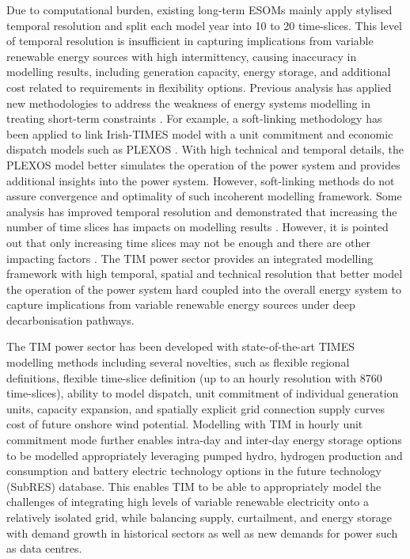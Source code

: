 \documentclass[gmd,manuscript]{copernicus}
\begin{document}
Due to computational burden, existing long-term ESOMs mainly apply stylised temporal resolution and split each model year into 10 to 20 time-slices. This level of temporal resolution is insufficient in capturing implications from variable renewable energy sources with high intermittency, causing inaccuracy in modelling results, including generation capacity, energy storage, and additional cost related to requirements in flexibility options. Previous analysis has applied new methodologies to address the weakness of energy systems modelling in treating short-term constraints \citep{Collins2017}. For example, a soft-linking methodology has been applied to link Irish-TIMES model with a unit commitment and economic dispatch models such as PLEXOS \citep{Deane2012}. With high technical and temporal details, the PLEXOS model better simulates the operation of the power system and provides additional insights into the power system. However, soft-linking methods do not assure convergence and optimality of such incoherent modelling framework. Some analysis has improved temporal resolution and demonstrated that increasing the number of time slices has impacts on modelling results \citep{Pina2011,Kannan2013,Gaur2019}. However, it is pointed out that only increasing time slices may not be enough and there are other impacting factors \citep{Poncelet2016}. The TIM power sector provides an integrated modelling framework with high temporal, spatial and technical resolution that better model the operation of the power system hard coupled into the overall energy system to capture implications from variable renewable energy sources under deep decarbonisation pathways. 

The TIM power sector has been developed with state-of-the-art TIMES modelling methods including several novelties, such as flexible regional definitions, flexible time-slice definition (up to an hourly resolution with 8760 time-slices), ability to model dispatch, unit commitment of individual generation units, capacity expansion, and spatially explicit grid connection supply curves cost of future onshore wind potential. Modelling with TIM in hourly unit commitment mode further enables intra-day and inter-day energy storage options to be modelled appropriately leveraging pumped hydro, hydrogen production and consumption and battery electric technology options in the future technology (SubRES) database. This enables TIM to be able to appropriately model the challenges of integrating high levels of variable renewable electricity onto a relatively isolated grid, while balancing supply, curtailment, and energy storage with demand growth in historical sectors as well as new demands for power such as data centres.
\end{document}
